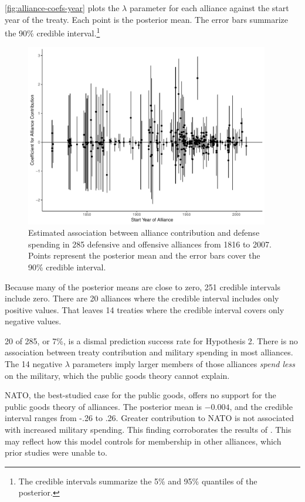 \documentclass[12pt]{article}
\begin{document}
\autoref{fig:alliance-coefs-year} plots the $\lambda$ parameter for each alliance against the start year of the treaty.
Each point is the posterior mean. 
The error bars summarize the 90\% credible interval.\footnote{The credible intervals summarize the 5\% and 95\% quantiles of the posterior.}  


\begin{figure}[htbp]
	\centering
		\includegraphics[width=0.95\textwidth]{alliance-coefs-year.pdf}
	\caption{Estimated association between alliance contribution and defense spending in 285 defensive and offensive alliances from 1816 to 2007. Points represent the posterior mean and the error bars cover the 90\% credible interval.}
	\label{fig:alliance-coefs-year}
\end{figure}


Because many of the posterior means are close to zero, 251 credible intervals include zero. 
There are 20 alliances where the credible interval includes only positive values. 
That leaves 14 treaties where the credible interval covers only negative values. 


20 of 285, or 7\%, is a dismal prediction success rate for Hypothesis 2. 
There is no association between treaty contribution and military spending in most alliances.
The 14 negative $\lambda$ parameters imply larger members of those alliances \emph{spend less} on the military, which the public goods theory cannot explain. 


NATO, the best-studied case for the public goods, offers no support for the public goods theory of alliances. 
The posterior mean is $-0.004$, and the credible interval ranges from -.26 to .26.  
Greater contribution to NATO is not associated with increased military spending. 
This finding corroborates the results of \citet{PluemperNeumayer2015}. 
This may reflect how this model controls for membership in other alliances, which prior studies were unable to. 
\end{document}
